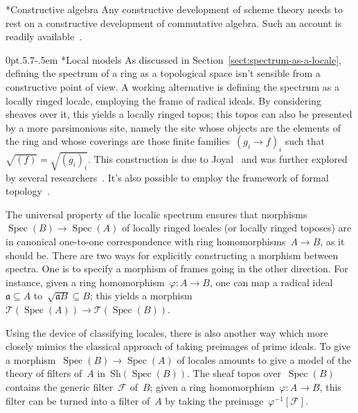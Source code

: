 \documentclass[10pt,reqno,a4paper]{amsbook}
\makeatletter
\theoremstyle{definition}
\theoremstyle{plain}
\theoremstyle{remark}
\newcommand{\F}{\mathcal{F}}
\newcommand{\T}{\mathcal{T}}
\newcommand{\aaa}{\mathfrak{a}}
\newcommand{\Sh}{\mathrm{Sh}}
\DeclareMathOperator{\Spec}{Spec}
\newcommand{\Open}{\T}
\newcommand{\?}{\,{:}\,}
\renewcommand{\_}{\mathpunct{.}\,}
\newcommand{\nocontentsline}[3]{}
\newcommand{\tocless}[1]{\let\addcontentsline=\nocontentsline}
\def\subsection{\@startsection{subsection}{2}%
  {0pt}{.5\linespacing\@plus.7\linespacing}{-.5em}%
  {\normalfont\bfseries}}
\makeatother
\begin{document}
{\tocless

\subsection*{Constructive algebra} Any constructive development of scheme
theory needs to rest on a constructive development of commutative algebra.
Such an account is readily
available~\cite{mines-richman-ruitenburg:constructive-algebra,lombardi:quitte:constructive-algebra}.

\subsection*{Local models} As discussed in
Section~\ref{sect:spectrum-as-a-locale}, defining the spectrum of a ring as a
topological space isn't sensible from a constructive point of view. A working
alternative is defining the spectrum as a locally ringed locale, employing the
frame of radical ideals. By considering sheaves over it, this yields a locally
ringed topos; this topos can also be presented by a more parsimonious site,
namely the site whose objects are the elements of the ring and whose coverings
are those finite families~$(g_i \to f)_i$ such that~$\sqrt{(f)} =
\sqrt{(g_i)_i}$.
This construction is due to
Joyal~\cite{joyal:spectrum,espanol:spectrum,tierney:spectrum} and was further explored
by several researchers~\cite{cls:spectral-schemes,cls:projective-spectrum}.
It's also possible to employ the framework of formal
topology~\cite{schuster:formal-zariski}.

The universal property of the localic spectrum ensures that morphisms~$\Spec(B)
\to \Spec(A)$ of locally ringed locales (or locally ringed toposes) are in
canonical one-to-one correspondence with ring homomorphisms~$A \to B$, as it
should be. There are two ways for explicitly constructing a morphism between
spectra. One is to specify a morphism of frames going in the other direction.
For instance, given a ring homomorphism~$\varphi : A \to B$, one can map a
radical ideal~$\aaa \subseteq A$ to~$\sqrt{\aaa B} \subseteq B$; this yields a
morphism~$\Open(\Spec(A)) \to \Open(\Spec(B))$.

Using the device of classifying locales, there is also another way which more
closely mimics the classical approach of taking preimages of prime ideals. To
give a morphism~$\Spec(B) \to \Spec(A)$ of locales amounts to give a model of
the theory of filters of~$A$ in~$\Sh(\Spec(B))$. The sheaf topos
over~$\Spec(B)$ contains the generic filter~$\F$ of~$B$; given a ring
homomorphism~$\varphi : A \to B$, this filter can be turned into a filter
of~$A$ by taking the preimage~$\varphi^{-1}[\F]$.

}
\end{document}
